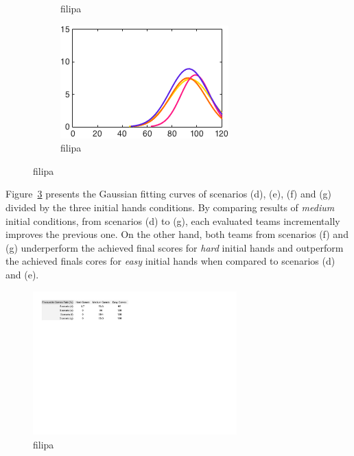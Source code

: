 \begin{figure}[h]
\begin{subfigure}[h]{0.32\textwidth}
                \caption{filipa}
                \label{fig:DEFGmedium}
        \end{subfigure}
        \begin{subfigure}[h]{0.32\textwidth}
                \includegraphics[width=\textwidth]{./img/5/DEFGeasy}
                \caption{filipa}
                \label{fig:DEFGeasy}
        \end{subfigure}
        \caption{filipa}
        \label{fig:DEFG-CH}
\end{figure}

Figure~\ref{fig:DEFG-CH} presents the Gaussian fitting curves of scenarios (d), (e), (f) and (g) divided by the three initial hands conditions.
By comparing results of \emph{medium} initial conditions, from scenarios (d) to (g), each evaluated teams incrementally improves the previous one.
On the other hand, both teams from scenarios (f) and (g) underperform the achieved final scores for \emph{hard} initial hands and outperform the achieved finals cores for \emph{easy} initial hands when compared to scenarios (d) and (e).

\begin{figure}[h!]
  \centering
    \includegraphics[width=0.7\textwidth]{./img/5/DEFG-fgr}
  \caption{filipa}
\label{fig:DEFG-fgr}
\end{figure}

